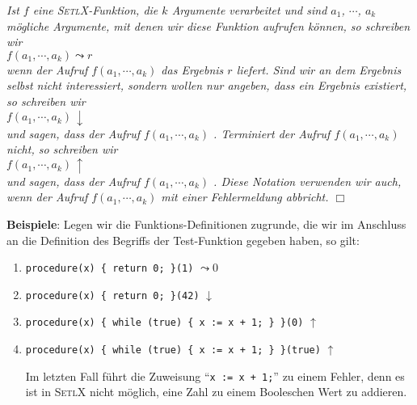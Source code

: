 \begin{Notation}[$\leadsto$, $\downarrow$, $\uparrow$]
{\em
Ist $f$ eine \textsc{SetlX}-Funktion, die $k$ Argumente verarbeitet und sind $a_1$, $\cdots$, $a_k$ mögliche
Argumente, mit denen wir diese Funktion aufrufen können,
so schreiben wir \\[0.3cm]
\hspace*{1.3cm} $f(a_1, \cdots, a_k) \leadsto r$ \\[0.3cm]
wenn der Aufruf $f(a_1, \cdots, a_k)$ das Ergebnis $r$ liefert.  Sind wir an dem Ergebnis
selbst nicht interessiert, sondern wollen nur angeben, dass ein Ergebnis existiert, so
schreiben wir \\[0.3cm]
\hspace*{1.3cm} $f(a_1, \cdots, a_k) \,\downarrow$ \\[0.3cm]
und sagen, dass der Aufruf $f(a_1, \cdots, a_k)$ .
Terminiert der Aufruf $f(a_1, \cdots, a_k)$ nicht, so schreiben wir \\[0.3cm]
\hspace*{1.3cm} $f(a_1, \cdots, a_k) \,\uparrow$ \\[0.3cm]
und sagen, dass der Aufruf $f(a_1, \cdots, a_k)$ .  Diese Notation
verwenden wir auch, wenn der Aufruf  $f(a_1, \cdots, a_k)$ mit einer Fehlermeldung abbricht.
\hspace*{\fill} $\Box$
}
\end{Notation}

\noindent
\textbf{Beispiele}: Legen wir die Funktions-Definitionen zugrunde, die wir im Anschluss an
die Definition des Begriffs der Test-Funktion gegeben haben, so gilt:
\begin{enumerate}
\item {\tt procedure(x) \{ return 0; \}(1)} $\leadsto 0$
\item {\tt procedure(x) \{ return 0; \}(42)} $\downarrow$
\item {\tt procedure(x) \{ while (true) \{ x := x + 1; \} \}(0)} $\uparrow$
\item {\tt procedure(x) \{ while (true) \{ x := x + 1; \} \}(true)} $\uparrow$

      Im letzten Fall führt die Zuweisung ``\texttt{x := x + 1;}'' zu einem Fehler, denn es ist in
      \textsc{SetlX} nicht möglich, eine Zahl zu einem Booleschen Wert zu addieren.
\end{enumerate} 

